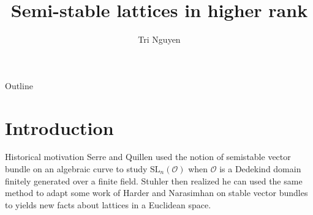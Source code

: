 \documentclass[pdf]{beamer}
\title{Semi-stable lattices in higher rank}
\author{Tri Nguyen}
\begin{document}
\begin{frame}
    \titlepage
\end{frame}

\begin{frame}{Outline}
    \tableofcontents
\end{frame}

\section{Introduction}
\begin{frame}{Historical motivation }
    Serre and Quillen used the notion of semistable vector
    bundle on an algebraic curve to study $\text{SL}_n(\mathcal{O})$ when $\mathcal{O}$ is a Dedekind domain finitely generated over a finite field. Stuhler
    then realized he can used the same method to adapt some work of Harder and Narasimhan on stable vector bundles to yields new facts
    about lattices in a Euclidean space.
\end{frame}
\end{document}
